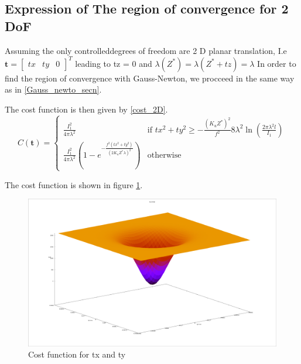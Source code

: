 \subsection{Expression of The region of convergence for 2 DoF}
Assuming the only controlleddegrees of freedom are 2 D planar translation, I.e $\textbf{t} = \begin{bmatrix}
    tx & ty & 0
\end{bmatrix}^{T}$ leading to tz = 0 and $\lambda(Z^{*}) = \lambda(Z^{*}+tz) =\lambda $
 In order to find the region of convergence with Gauss-Newton, we procceed in the same way as in \ref{Gauss_newto_secn}.
 \par The cost function is then given by \eqref{cost_2D}.
 \begin{equation}
    C(\textbf{t} ) = \begin{cases}
        \frac{I_{1}^{2}}{4\pi\lambda^2} & \text{if } tx^{2}+ty^{2} \geq -\frac{(K_{u}Z^{*})^{2}}{f^{2}}8\lambda^2\ln\left(\frac{2\pi\lambda^{2}l}{I_{1}}\right)\\
        \frac{I_{1}^{2}}{4\pi\lambda^2} \left(1- e^{-\frac{f^{2}\left(tx^{2}+ty^{2}\right)}{(2K_{u}Z^{*}\lambda)^{2}}}\right) & \text{otherwise}
    \end{cases}
    \label{cost_2D}
 \end{equation}
\par The cost function is shown in figure \ref{cost_fig}.
\begin{figure}[h!]
    \centering
    \includegraphics[scale = 0.15]{figures/C(tx,ty).png}
    \caption{Cost function for tx and ty}
    \label{cost_fig}
\end{figure}

